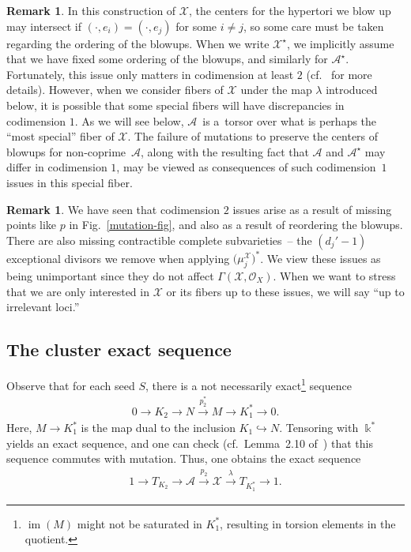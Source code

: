 \documentclass[11pt]{article}
\numberwithin{equation}{section}
\numberwithin{figure}{section}
\numberwithin{table}{section}
\DeclareMathOperator{\im}{im}
\let\rar=\rightarrow
\let\s=\mathcal
\newcommand {\kk} {\Bbbk}
\theoremstyle{definition}
\newtheorem{rmk}[thm]{Remark}
\begin{document}
\begin{rmk}\label{CodimensionOne}In this construction of $\s{X}$, the centers for the hypertori we blow up may intersect if $(\cdot,e_i)=(\cdot,e_j)$ for some $i\neq j$, so some care must be taken regarding the ordering of the blowups. When we write $\s{X}^{\star}$, we implicitly assume that we have fixed some ordering of the blowups, and similarly for $\s{A}^{\star}$. Fortunately, this issue only matters in codimension at least $2$ (cf.~\cite{GHK3} for more details). However, when we consider fibers of $\s{X}$ under the map $\lambda$ introduced below, it is possible that some special fibers will have discrepancies in codimension $1$. As we will see below, $\s{A}$~is a~torsor over what is perhaps the ``most special'' fiber of $\s{X}$. The failure of mutations to preserve the centers of blowups for non-coprime~$\s{A}$, along with the resulting fact that $\s{A}$ and $\s{A}^{\star}$ may differ in codimension $1$, may be viewed as consequences of such codimension~$1$ issues in this special fiber.
\end{rmk}

\begin{rmk}\label{affinization}We have seen that codimension $2$ issues arise as a result of missing points like $p$ in Fig.~\ref{mutation-fig}, and also as a result of reordering the blowups. There are also missing contractible complete subvarieties~-- the $(d_j'-1)$ exceptional divisors we remove when applying $\big(\mu_j^{\s{X}}\big)^*$. We view these issues as being unimportant since they do not affect $\Gamma(\s{X},\s{O}_X)$. When we want to stress that we are only interested in $\s{X}$ or its fibers up to these issues, we will say ``up to irrelevant loci.''
\end{rmk}

\subsection{The cluster exact sequence}\label{cluster exact section}
Observe that for each seed $S$, there is a not necessarily exact\footnote{$\im(M)$ might not be saturated in $K_1^*$, resulting in torsion elements in the quotient.} sequence
\begin{gather*}
	0 \rar K_2 \rar N \stackrel{p_2^*}{\rar} M \rar K_1^* \rar 0.
\end{gather*}
Here, $M\rar K_1^*$ is the map dual to the inclusion $K_1\hookrightarrow N$. Tensoring with $\kk^*$ yields an exact sequence, and one can check (cf.\ Lemma~2.10 of~\cite{FG1}) that this sequence commutes with mutation. Thus, one obtains the exact sequence
\begin{gather*}
	1\rar T_{K_2} \rar \s{A} \stackrel{p_2}{\rar} \s{X} \stackrel{\lambda}{\rar} T_{K_1^*} \rar 1.
\end{gather*}
\end{document}
